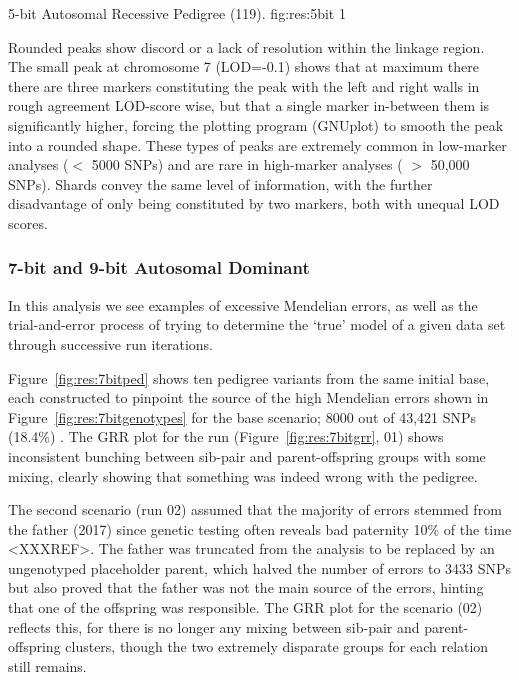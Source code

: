 {5-bit Autosomal Recessive Pedigree (119).}
{fig:res:5bit}
{1}

Rounded peaks show discord or a lack of resolution within the linkage region. The small peak at chromosome 7 (LOD=-0.1) shows that at maximum there there are three markers constituting the peak with the left and right walls in rough agreement LOD-score wise, but that a single marker in-between them is significantly higher, forcing the plotting program (GNUplot) to smooth the peak into a rounded shape. These types of peaks are extremely common in low-marker analyses ($<$ 5000 SNPs) and are rare in high-marker analyses ( $>$ 50,000 SNPs). Shards convey the same level of information, with the further disadvantage of only being constituted by two markers, both with unequal LOD scores.

\subsubsection*{7-bit and 9-bit Autosomal Dominant}

In this analysis we see examples of excessive Mendelian errors, as well as the trial-and-error process of trying to determine the ‘true’ model of a given data set through successive run iterations.

Figure~\ref{fig:res:7bitped} shows ten pedigree variants from the same initial base, each constructed to pinpoint the source of the high Mendelian errors shown in Figure~\ref{fig:res:7bitgenotypes} for the base scenario; 8000 out of 43,421 SNPs (18.4\%) . The GRR plot for the run (Figure~\ref{fig:res:7bitgrr}, 01) shows inconsistent bunching between sib-pair and parent-offspring groups with some mixing, clearly showing that something was indeed wrong with the pedigree.

The second scenario (run 02) assumed that the majority of errors stemmed from the father (2017) since genetic testing often reveals bad paternity 10\% of the time <XXXREF>. The father was truncated from the analysis to be replaced by an ungenotyped placeholder parent, which halved the number of errors to 3433 SNPs but also proved that the father was not the main source of the errors, hinting that one of the offspring was responsible. The GRR plot for the scenario (02) reflects this, for there is no longer any mixing between sib-pair and parent-offspring clusters, though the two extremely disparate groups for each relation still remains.


